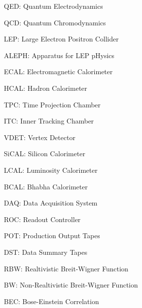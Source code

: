%
%
\begin{singlespacing}
\begin{list}{}{}
\item   QED: Quantum Electrodynamics
\item   QCD: Quantum Chromodynamics
\item   LEP: Large Electron Positron Collider
\item ALEPH: Apparatus for LEP pHysics
\item  ECAL: Electromagnetic Calorimeter
\item  HCAL: Hadron Calorimeter
\item   TPC: Time Projection Chamber
\item   ITC: Inner Tracking Chamber
\item  VDET: Vertex Detector
\item SiCAL: Silicon Calorimeter
\item  LCAL: Luminosity Calorimeter
\item  BCAL: Bhabha Calorimeter
\item   DAQ: Data Acquisition System
\item   ROC: Readout Controller
\item   POT: Production Output Tapes
\item   DST: Data Summary Tapes
\item   RBW: Realtivistic Breit-Wigner Function
\item    BW: Non-Realtivistic Breit-Wigner Function
\item   BEC: Bose-Einstein Correlation
\end{list}
\end{singlespacing}

